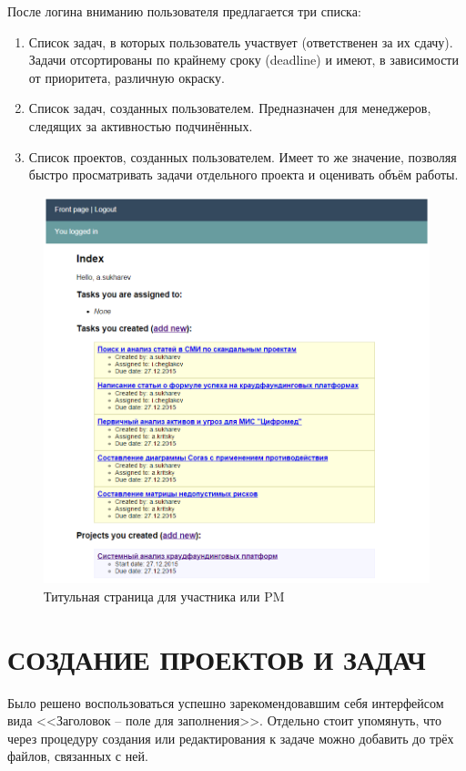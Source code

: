 \documentclass[14pt, a4paper]{extreport}
\begin{document}
После логина вниманию пользователя предлагается три списка:

\begin{enumerate}
\item Список задач, в которых пользователь участвует (ответственен за их сдачу). Задачи отсортированы по крайнему сроку (deadline) и имеют, в зависимости от приоритета, различную окраску.
\item Список задач, созданных пользователем. Предназначен для менеджеров, следящих за активностью подчинённых.
\item Список проектов, созданных пользователем. Имеет то же значение, позволяя быстро просматривать задачи отдельного проекта и оценивать объём работы.
\end{enumerate}

\begin{figure}[!htb]
  \centering
    \includegraphics[scale=0.8]{../shared_images/frontend/title-logged-in.png}
   \caption{Титульная страница для участника или PM}
    \label{fig:start}
\end{figure}

\section{\MakeTextUppercase{Создание проектов и задач}}
Было решено воспользоваться успешно зарекомендовавшим себя интерфейсом вида <<Заголовок -- поле для заполнения>>. Отдельно стоит упомянуть, что через процедуру создания или редактирования к задаче можно добавить до трёх файлов, связанных с ней.
\end{document}
